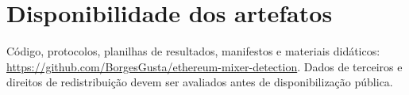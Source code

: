\documentclass[11pt,a4paper]{article}
\begin{document}
\section*{Disponibilidade dos artefatos}
Código, protocolos, planilhas de resultados, manifestos e materiais didáticos: \url{https://github.com/BorgesGusta/ethereum-mixer-detection}. Dados de terceiros e direitos de redistribuição devem ser avaliados antes de disponibilização pública.



\end{document}
